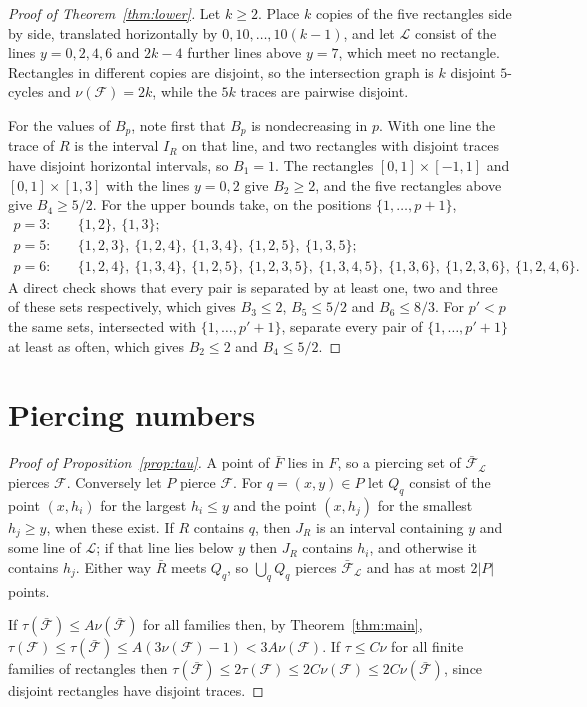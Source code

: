 \documentclass[11pt]{article}
\theoremstyle{remark}
\newcommand{\F}{\mathcal{F}}
\newcommand{\Fb}{\bar{\mathcal{F}}}
\newcommand{\cL}{\mathcal{L}}
\begin{document}
\begin{proof}[Proof of Theorem~\ref{thm:lower}]
Let $k\ge2$. Place $k$ copies of the five rectangles side by side, translated horizontally by $0,10,\dots,10(k-1)$, and let $\cL$ consist of the lines $y=0,2,4,6$ and $2k-4$ further lines above $y=7$, which meet no rectangle. Rectangles in different copies are disjoint, so the intersection graph is $k$ disjoint $5$-cycles and $\nu(\F)=2k$, while the $5k$ traces are pairwise disjoint.

For the values of $B_p$, note first that $B_p$ is nondecreasing in $p$. With one line the trace of $R$ is the interval $I_R$ on that line, and two rectangles with disjoint traces have disjoint horizontal intervals, so $B_1=1$. The rectangles $[0,1]\times[-1,1]$ and $[0,1]\times[1,3]$ with the lines $y=0,2$ give $B_2\ge2$, and the five rectangles above give $B_4\ge5/2$. For the upper bounds take, on the positions $\{1,\dots,p+1\}$,
\begin{align*}
p=3:&\quad \{1,2\},\ \{1,3\};\\
p=5:&\quad \{1,2,3\},\ \{1,2,4\},\ \{1,3,4\},\ \{1,2,5\},\ \{1,3,5\};\\
p=6:&\quad \{1,2,4\},\ \{1,3,4\},\ \{1,2,5\},\ \{1,2,3,5\},\ \{1,3,4,5\},\ \{1,3,6\},\ \{1,2,3,6\},\ \{1,2,4,6\}.
\end{align*}
A direct check shows that every pair is separated by at least one, two and three of these sets respectively, which gives $B_3\le2$, $B_5\le5/2$ and $B_6\le8/3$. For $p'<p$ the same sets, intersected with $\{1,\dots,p'+1\}$, separate every pair of $\{1,\dots,p'+1\}$ at least as often, which gives $B_2\le2$ and $B_4\le5/2$.
\end{proof}

\section{Piercing numbers}\label{sec:tau}

\begin{proof}[Proof of Proposition~\ref{prop:tau}]
A point of $\bar F$ lies in $F$, so a piercing set of $\Fb_\cL$ pierces $\F$. Conversely let $P$ pierce $\F$. For $q=(x,y)\in P$ let $Q_q$ consist of the point $(x,h_i)$ for the largest $h_i\le y$ and the point $(x,h_j)$ for the smallest $h_j\ge y$, when these exist. If $R$ contains $q$, then $J_R$ is an interval containing $y$ and some line of $\cL$; if that line lies below $y$ then $J_R$ contains $h_i$, and otherwise it contains $h_j$. Either way $\bar R$ meets $Q_q$, so $\bigcup_q Q_q$ pierces $\Fb_\cL$ and has at most $2|P|$ points.

If $\tau(\Fb)\le A\nu(\Fb)$ for all families then, by Theorem~\ref{thm:main}, $\tau(\F)\le\tau(\Fb)\le A(3\nu(\F)-1)<3A\nu(\F)$. If $\tau\le C\nu$ for all finite families of rectangles then $\tau(\Fb)\le2\tau(\F)\le2C\nu(\F)\le2C\nu(\Fb)$, since disjoint rectangles have disjoint traces.
\end{proof}
\end{document}
